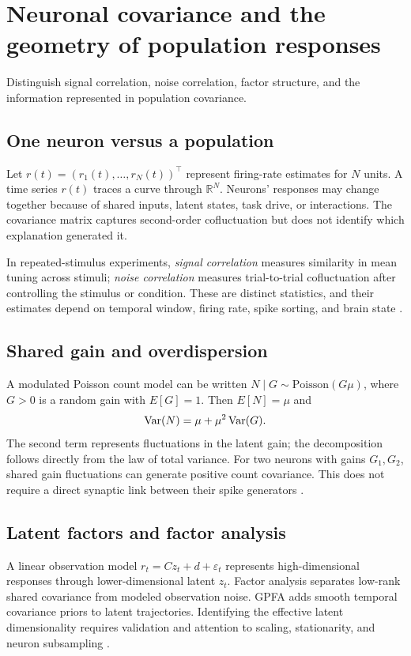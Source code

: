 \chapter{Neuronal covariance and the geometry of population responses}\label{ch:population}
\begin{readergoal}Distinguish signal correlation, noise correlation, factor structure, and the information represented in population covariance.\end{readergoal}
\section{One neuron versus a population}
Let $r(t)=(r_1(t),\ldots,r_N(t))^\top$ represent firing-rate estimates for $N$ units. A time series $r(t)$ traces a curve through $\mathbb R^N$. Neurons' responses may change together because of shared inputs, latent states, task drive, or interactions. The covariance matrix captures second-order cofluctuation but does not identify which explanation generated it.

In repeated-stimulus experiments, \emph{signal correlation} measures similarity in mean tuning across stimuli; \emph{noise correlation} measures trial-to-trial cofluctuation after controlling the stimulus or condition. These are distinct statistics, and their estimates depend on temporal window, firing rate, spike sorting, and brain state \cite{CohenKohn2011}.

\section{Shared gain and overdispersion}
A modulated Poisson count model can be written $N\mid G\sim\mathrm{Poisson}(G\mu)$, where $G>0$ is a random gain with $E[G]=1$. Then $E[N]=\mu$ and
\[\operatorname{Var}(N)=\mu+\mu^2\operatorname{Var}(G).\]
The second term represents fluctuations in the latent gain; the decomposition follows directly from the law of total variance. For two neurons with gains $G_1,G_2$, shared gain fluctuations can generate positive count covariance. This does not require a direct synaptic link between their spike generators \cite{Goris2014}.

\section{Latent factors and factor analysis}
A linear observation model $r_t=Cz_t+d+\varepsilon_t$ represents high-dimensional responses through lower-dimensional latent $z_t$. Factor analysis separates low-rank shared covariance from modeled observation noise. GPFA adds smooth temporal covariance priors to latent trajectories. Identifying the effective latent dimensionality requires validation and attention to scaling, stationarity, and neuron subsampling \cite{CunninghamYu2014,Gao2017}.

